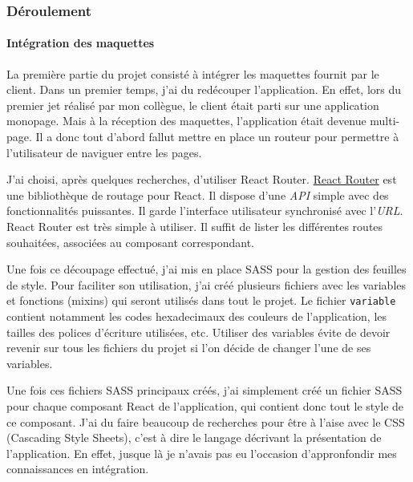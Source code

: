 \bigskip

\subsubsection{Déroulement}\label{duxe9roulement}

\bigskip

\paragraph{Intégration des
maquettes}\label{intuxe9gration-des-maquettes}

\bigskip

La première partie du projet consisté à intégrer les maquettes fournit
par le client. Dans un premier temps, j'ai du redécouper l'application.
En effet, lors du premier jet réalisé par mon collègue, le client était
parti sur une application monopage. Mais à la réception des maquettes,
l'application était devenue multi-page. Il a donc tout d'abord fallut
mettre en place un routeur pour permettre à l'utilisateur de naviguer
entre les pages.

\bigskip

J'ai choisi, après quelques recherches, d'utiliser React Router.
\href{https://github.com/ReactTraining/react-router}{React Router} est
une bibliothèque de routage pour React. Il dispose d'une \emph{API}
simple avec des fonctionnalités puissantes. Il garde l'interface
utilisateur synchronisé avec l'\emph{URL}. React Router est très simple
à utiliser. Il suffit de lister les différentes routes souhaitées,
associées au composant correspondant.

\bigskip

Une fois ce découpage effectué, j'ai mis en place SASS pour la gestion
des feuilles de style. Pour faciliter son utilisation, j'ai créé
plusieurs fichiers avec les variables et fonctions (mixins) qui seront
utilisés dans tout le projet. Le fichier \texttt{variable} contient
notamment les codes hexadecimaux des couleurs de l'application, les
tailles des polices d'écriture utilisées, etc. Utiliser des variables
évite de devoir revenir sur tous les fichiers du projet si l'on décide
de changer l'une de ses variables.

\bigskip

Une fois ces fichiers SASS principaux créés, j'ai simplement créé un
fichier SASS pour chaque composant React de l'application, qui contient
donc tout le style de ce composant. J'ai du faire beaucoup de recherches
pour être à l'aise avec le CSS (Cascading Style Sheets), c'est à dire le
langage décrivant la présentation de l'application. En effet, jusque là
je n'avais pas eu l'occasion d'appronfondir mes connaissances en
intégration.


